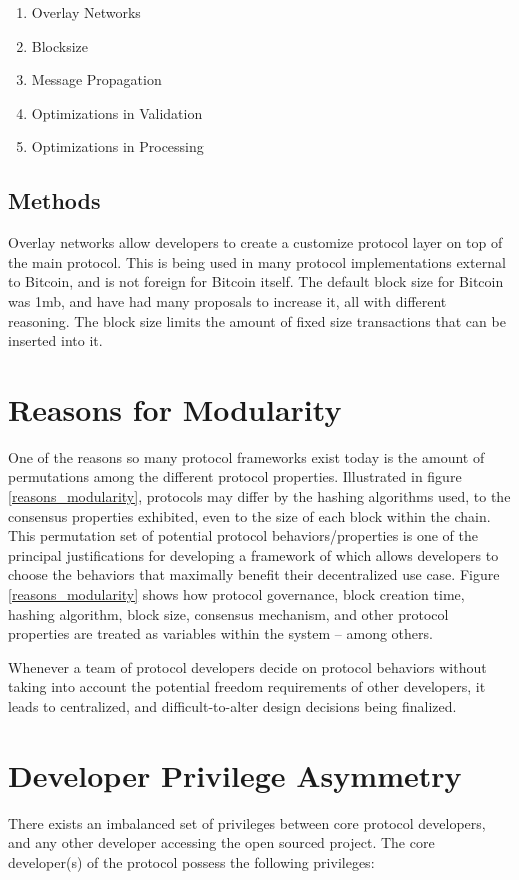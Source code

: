 \documentclass[12pt, titlepage, twocolumn]{report}
\begin{document}
\begin{enumerate}
	\item Overlay Networks
	\item Blocksize
	\item Message Propagation
	\item Optimizations in Validation
	\item Optimizations in Processing
\end{enumerate}

\subsection{Methods}
Overlay networks allow developers to create a customize protocol layer on top of the main protocol. This is being used in many protocol implementations external to Bitcoin, and is not foreign for Bitcoin itself. The default block size for Bitcoin was 1mb, and have had many proposals to increase it, all with different reasoning. The block size limits the amount of fixed size transactions that can be inserted into it.


\section{Reasons for Modularity}
One of the reasons so many protocol frameworks exist today is the amount of permutations among the different protocol properties. Illustrated in figure \ref{reasons_modularity}, protocols may differ by the hashing algorithms used, to the consensus properties exhibited, even to the size of each block within the chain.  This permutation set of potential protocol behaviors/properties is one of the principal justifications for developing a framework of which allows developers to choose the behaviors that maximally benefit their decentralized use case. Figure \ref{reasons_modularity} shows how protocol governance, block creation time, hashing algorithm, block size, consensus mechanism, and other protocol properties are treated as variables within the system -- among others.

Whenever a team of protocol developers decide on protocol behaviors without taking into account the potential freedom requirements of other developers, it leads to centralized, and difficult-to-alter design decisions being finalized. 


\section{Developer Privilege Asymmetry}
There exists an imbalanced set of privileges between core protocol developers, and any other developer accessing the open sourced project. The core developer(s) of the protocol possess the following privileges:
\end{document}
